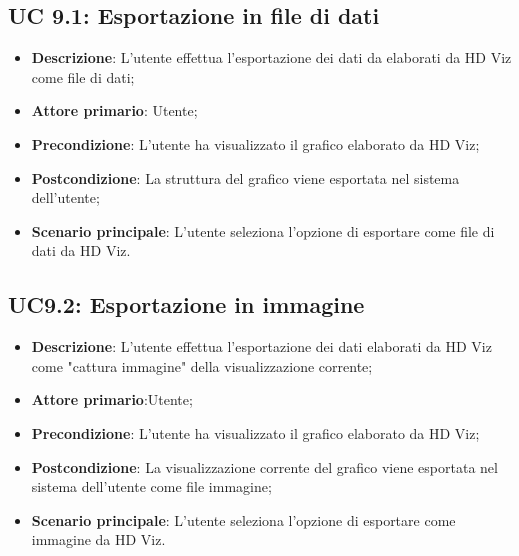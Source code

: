 \subsection{UC 9.1: Esportazione in file di dati}
\begin{itemize}
    \item{\textbf{Descrizione}}: L'utente effettua l'esportazione dei dati da elaborati da HD Viz come file di dati;
    \item{\textbf{Attore primario}}: Utente;
    \item{\textbf{Precondizione}}: L'utente ha visualizzato il grafico elaborato da HD Viz;
    \item{\textbf{Postcondizione}}: La struttura del grafico viene esportata nel sistema dell'utente;
    \item{\textbf{Scenario principale}}: L'utente seleziona l'opzione di esportare come file di dati da HD Viz.
\end{itemize}

\subsection{UC9.2: Esportazione in immagine}
\begin{itemize}
    \item{\textbf{Descrizione}}:    L'utente effettua l'esportazione dei dati elaborati da HD Viz come 
                                    "cattura immagine" della visualizzazione corrente;
    \item{\textbf{Attore primario}}:Utente;
    \item{\textbf{Precondizione}}:  L'utente ha visualizzato il grafico elaborato da HD Viz;
    \item{\textbf{Postcondizione}}: La visualizzazione corrente del grafico viene esportata nel sistema 
                                    dell'utente come file immagine;
    \item{\textbf{Scenario principale}}: L'utente seleziona l'opzione di esportare come immagine da HD Viz.
\end{itemize}
